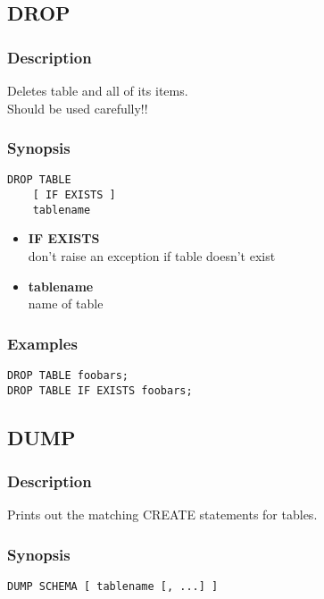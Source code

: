\subsection{DROP}
\subsubsection{Description}
Deletes table and all of its items.\\
Should be used carefully!!

\subsubsection{Synopsis}
\lstset{language=Java}
\begin{lstlisting}
DROP TABLE
    [ IF EXISTS ]
    tablename	
\end{lstlisting}

\begin{itemize}
	\item \textbf{IF EXISTS}\\
	don't raise an exception if table doesn't exist
	\item \textbf{tablename} \\
	name of table
\end{itemize}

\subsubsection{Examples}
\lstset{language=Java}
\begin{lstlisting}
DROP TABLE foobars;
DROP TABLE IF EXISTS foobars;	
\end{lstlisting}
\vspace{40pt}

\subsection{DUMP}
\subsubsection{Description}
Prints out the matching CREATE statements for tables.

\subsubsection{Synopsis}
\lstset{language=Java}
\begin{lstlisting}
DUMP SCHEMA [ tablename [, ...] ]
\end{lstlisting}

